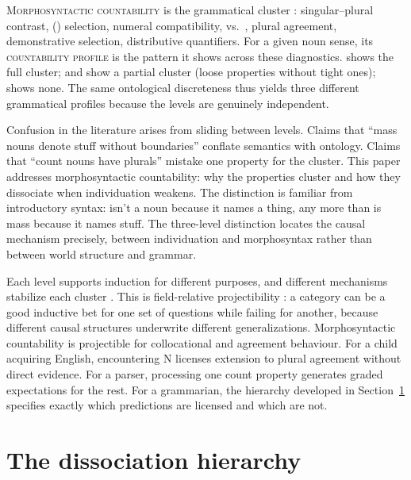 \documentclass[12pt,a4paper]{article}
\begin{document}
\textsc{Morphosyntactic countability} is the grammatical cluster \citep[pp.~333--336]{huddleston2002,allan1980}: singular--plural contrast, () selection, numeral compatibility,  vs.\ , plural agreement, demonstrative selection, distributive quantifiers. For a given noun sense, its \textsc{countability profile} is the pattern it shows across these diagnostics.  shows the full cluster;  and  show a partial cluster (loose properties without tight ones);  shows none. The same ontological discreteness thus yields three different grammatical profiles because the levels are genuinely independent.

Confusion in the literature arises from sliding between levels. Claims that \enquote{mass nouns denote stuff without boundaries} conflate semantics with ontology. Claims that \enquote{count nouns have plurals} mistake one property for the cluster. This paper addresses morphosyntactic countability: why the properties cluster and how they dissociate when individuation weakens. The distinction is familiar from introductory syntax:  isn't a noun because it names a thing, any more than  is mass because it names stuff. The three-level distinction locates the causal mechanism precisely, between individuation and morphosyntax rather than between world structure and grammar.

Each level supports induction for different purposes, and different mechanisms stabilize each cluster \citep{reynolds2025stack}. This is field-relative projectibility \citep{Goodman1955,boyd1991}: a category can be a good inductive bet for one set of questions while failing for another, because different causal structures underwrite different generalizations. Morphosyntactic countability is projectible for collocational and agreement behaviour. For a child acquiring English, encountering  N licenses extension to plural agreement without direct evidence. For a parser, processing one count property generates graded expectations for the rest. For a grammarian, the hierarchy developed in Section~\ref{sec:hierarchy} specifies exactly which predictions are licensed and which are not.

\section{The dissociation hierarchy}\label{sec:hierarchy}
\end{document}
